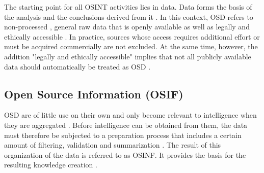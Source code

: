 \documentclass[10pt]{article}
\begin{document}
The starting point for all OSINT activities lies in data. Data forms the basis of the analysis and the conclusions derived from it \cite{Gibson.2016}. In this context, OSD refers to non-processed \cite{DosPassos.2017}, general raw data that is openly available \cite{Burke.2007} as well as legally and ethically accessible \cite{Schaurer.2010,NorthAtlanticTreatyOrganization.2001}. In practice, sources whose access requires additional effort \cite{Bohm.2021} or must be acquired commercially \cite{Williams.2018,NorthAtlanticTreatyOrganization.2001,JointChiefsofStaffU.S.Army.2013} are not excluded. At the same time, however, the addition "legally and ethically accessible" implies that not all publicly available data should automatically be treated as OSD \cite{DepartmentoftheArmy.2012,Schaurer.2010}.

\subsection{Open Source Information (OSIF)}
OSD are of little use on their own and only become relevant to intelligence when they are aggregated \cite{Williams.2018}. Before intelligence can be obtained from them, the data must therefore be subjected to a preparation process that includes a certain amount of filtering, validation and summarization \cite{DosPassos.2017,NorthAtlanticTreatyOrganization.2001}. The result of this organization of the data \cite{Schaurer.2010} is referred to as OSINF. It provides the basis for the resulting knowledge creation \cite{DosPassos.2017,Schaurer.2010}.
\end{document}
